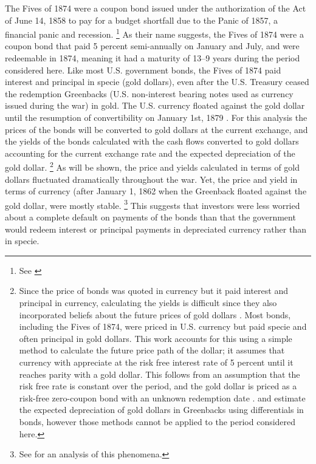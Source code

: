 The Fives of 1874 were a coupon bond issued under the authorization of the Act of June 14, 1858 to pay for a budget shortfall due to the Panic of 1857, a financial panic and recession.%
\footnote{
  See \textcites[p. 76]{Bayley1882}[78--79]{DeKnight1900}[42-43]{Treasury1863}[300-301, 305]{HomerSylla2005}
}
As their name suggests, the Fives of 1874 were a coupon bond that paid 5 percent semi-annually on January and July, and were redeemable in 1874, meaning it had a maturity of 13--9 years during the period considered here.
Like most U.S. government bonds, the Fives of 1874 paid interest and principal in specie (gold dollars), even after the U.S. Treasury ceased the redemption Greenbacks (U.S. non-interest bearing notes used as currency issued during the war) in gold.
The U.S. currency floated against the gold dollar until the resumption of convertibility on January 1st, 1879 \parencites{Dewey1918}{WillardGuinnaneEtAl1996}.
For this analysis the prices of the bonds will be converted to gold dollars at the current exchange, and the yields of the bonds calculated with the cash flows converted to gold dollars accounting for the current exchange rate and the expected depreciation of the gold dollar.%
\footnote{
  Since the price of bonds was quoted in currency but it paid interest and principal in currency, calculating the yields is difficult since they also incorporated beliefs about the future prices of gold dollars \parencites[Appendix A]{Macaulay1938}{Roll1972}{Calomiris1988}[302-303]{HomerSylla2005}.
  Most bonds, including the Fives of 1874, were priced in U.S. currency but paid specie and often principal in gold dollars.
  This work accounts for this using a simple method to calculate the future price path of the dollar; it assumes that currency with appreciate at the risk free interest rate of 5 percent until it reaches parity with a gold dollar.
  This follows from an assumption that the risk free rate is constant over the period, and the gold dollar is priced as a risk-free zero-coupon bond with an unknown redemption date \cite{McCandless1996}.
  \textcite{Roll1972} and \textcite{Calomiris1988} estimate the expected depreciation of gold dollars in Greenbacks using differentials in bonds, however those methods cannot be applied to the period considered here.
}
As will be shown, the price and yields calculated in terms of gold dollars fluctuated dramatically throughout the war.
Yet, the price and yield in terms of currency (after January 1, 1862 when the Greenback floated against the gold dollar, were mostly stable.%
\footnote{See \textcite{Roll1972} for an analysis of this phenomena.}
This suggests that investors were less worried about a complete default on payments of the bonds than that the government would redeem interest or principal payments in depreciated currency rather than in specie.

